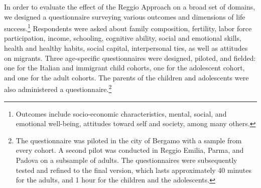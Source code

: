 
In order to evaluate the effect of the Reggio Approach on a broad set of domains, we designed a questionnaire surveying various outcomes and dimensions of life success.\footnote{Outcomes include socio-economic characteristics, mental, social, and emotional well-being, attitudes toward self and society, among many others.} Respondents were asked about family composition, fertility, labor force participation, income, schooling, cognitive ability, social and emotional skills, health and healthy habits, social capital, interpersonal ties, as well as attitudes on migrants. Three age-specific questionnaires were designed, piloted, and fielded: one for the Italian and immigrant child cohorts, one for the adolescent cohort, and one for the adult cohorts. The parents of the children and adolescents were also administered a questionnaire.\footnote{The questionnaire was piloted in the city of Bergamo with a sample from every cohort. A second pilot was conducted in Reggio Emilia, Parma, and Padova on a subsample of adults. The questionnaires were subsequently tested and refined to the final version, which lasts approximately 40 minutes for the adults, and 1 hour for the children and the adolescents.} 